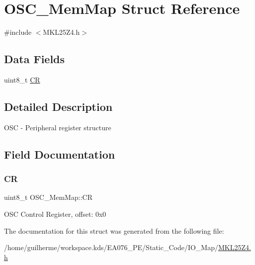 \hypertarget{struct_o_s_c___mem_map}{}\section{O\+S\+C\+\_\+\+Mem\+Map Struct Reference}
\label{struct_o_s_c___mem_map}


{\ttfamily \#include $<$M\+K\+L25\+Z4.\+h$>$}

\subsection*{Data Fields}
\begin{DoxyCompactItemize}
\item 
uint8\+\_\+t \hyperlink{struct_o_s_c___mem_map_adb3c443099915a22c9951ff23c8eaa16}{CR}
\end{DoxyCompactItemize}


\subsection{Detailed Description}
O\+SC -\/ Peripheral register structure 

\subsection{Field Documentation}
\mbox{\label{struct_o_s_c___mem_map_adb3c443099915a22c9951ff23c8eaa16}} 
\subsubsection{\texorpdfstring{CR}{CR}}
{\footnotesize\ttfamily uint8\+\_\+t O\+S\+C\+\_\+\+Mem\+Map\+::\+CR}

O\+SC Control Register, offset\+: 0x0 

The documentation for this struct was generated from the following file\+:\begin{DoxyCompactItemize}
\item 
/home/guilherme/workspace.\+kds/\+E\+A076\+\_\+\+P\+E/\+Static\+\_\+\+Code/\+I\+O\+\_\+\+Map/\hyperlink{_m_k_l25_z4_8h}{M\+K\+L25\+Z4.\+h}\end{DoxyCompactItemize}

